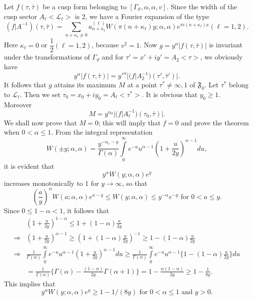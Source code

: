 Let $f(\tau,\bar{\tau})$ be a cusp form belonging to
$[\Gamma_{\vartheta}, \alpha, \alpha, v]$. Since the width of the cusp
sector $A_{\ell}<\mathscr{L}_{\ell}>$ is 2, we have a
Fourier expansion of the type
$$
(f|A^{-1})(\tau,\bar{\tau}) = \sum_{n+\kappa_{\ell}\neq 0}
a^{(\ell)}_{n+\kappa_{\ell}} W(\pi
(n+\kappa_{\ell})y;\alpha,\alpha)e^{\pi i(n+\kappa_{\ell})x} (\ell=1,2).
$$
Here $\kappa_{\ell}=0$ or $\dfrac{1}{2}(\ell=1,2)$, because
$v^2=1$. Now $g=y^{\alpha}|f(\tau,\bar{\tau})|$ is invariant under the
transformations of $\Gamma_{\vartheta}$ and for
$\tau'=x'+iy'=A_2<\tau>$, we obviously have 
$$
y^{\alpha} |f(\tau,\bar{\tau})| = y'^{\alpha}
|(f|A^{-1}_2)(\tau',\bar{\tau}')|. 
$$
It follows that $g$ attains its maximum $M$ at a point $\tau^{\ast}
\neq \infty,1$ of $\mathfrak{F}_0$. Let $\tau^{\ast}$ belong to
$\mathscr{L}_{\ell}$. Then we set $\tau_0=x_0+iy_0 =
A_{\ell}<\tau^{\ast}>$. It is obvious that $y_0\geq 1$. Moreover 
$$
M=y^{\alpha_0} |(f|A^{-1}_{\ell})(\tau_0,\bar{\tau})|.
$$
We shall now prove that $M=0$; this will imply that $f=0$ and prove
the theorem when $0< \alpha \leq 1$. From the integral representation
$$
W(\pm y;\alpha,\alpha) = \frac{y^{-\alpha_e-y}}{\Gamma(\alpha)}
\int\limits^{\infty}_{0} e^{-u} u^{\alpha-1}
(1+\frac{u}{2y})^{\alpha-1} du,
$$
it is evident that 
$$
y^{\alpha}W(y;\alpha,\alpha)e^y
$$
increases monotonically to 1 for $y\to \infty$, so that 
\begin{equation*}
(\frac{a}{y})^{\alpha} W (a;\alpha,\alpha) e^{a-y}\leq
  W(y;\alpha,\alpha) \leq y^{-\alpha} e^{-y} \text{ for } 0 < a \leq
  y. \tag{7}\label{c4:eq3:7} 
\end{equation*}
Since \pageoriginale $0\leq 1-\alpha<1$, it follows that
{\fontsize{10}{12}\selectfont
\begin{align*}
& (1+\frac{u}{2y})^{1-\alpha} \leq 1 + (1-\alpha) \frac{u}{2y}\\
\Longrightarrow & (1+\frac{u}{2y})^{\alpha-1} \geq
(1+(1-\alpha)\frac{u}{2y})^{-1} \geq 1 -(1-\alpha) \frac{u}{2y}\\
\Longrightarrow & \frac{1}{\Gamma(\alpha)} \int\limits^{\infty}_0
e^{-u} u^{\alpha-1} (1+\frac{u}{2y})^{\alpha-1} du \geq
\frac{1}{\Gamma(\alpha)} \int\limits^{\infty}_0 e^{-u} u^{\alpha-1}
\{1-(1-\alpha)\frac{u}{2y}\} du\\
& = \frac{1}{\Gamma(\alpha)} \{\Gamma(\alpha)-\frac{(1-\alpha)}{2y}
\Gamma(\alpha+1)\} = 1-\frac{\alpha(1-\alpha)}{2y} \geq 1 -\frac{1}{8y}.
\end{align*}}\relax
This implies that
\begin{equation*}
y^{\alpha} W(y;\alpha, \alpha) e^y \geq 1-1/(8y) \text{ for } 0 <
\alpha \leq 1 \text{ and } y >0. \tag{8}\label{c4:eq3:8}
\end{equation*}
